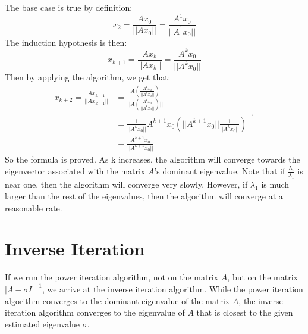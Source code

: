 \documentclass[11pt]{amsart}
\begin{document}
The base case is true by definition:
\[
	x_2 = \frac{Ax_0}{||Ax_0||} = \frac{A^1x_0}{||A^1x_0||}
\]
The induction hypothesis is then:
\[
	x_{k+1} = \frac{Ax_k}{||Ax_k||} = \frac{A^kx_0}{||A^kx_0||}
\]
Then by applying the algorithm, we get that:
\begin{align*}
	x_{k+2} = \frac{Ax_{k+1}}{||Ax_{k+1}||} &= \frac{A(\frac{A^kx_0}{||A^kx_0||})}{||A(\frac{A^kx_0}{||A^kx_0||})||}\\
	&= \frac{1}{||A^kx_0||}A^{k+1}x_0(||A^{k+1}x_0||\frac{1}{||A^kx_0||})^{-1} \\
	&=\frac{A^{k+1}x_0}{||A^{k+1}x_0||}
\end{align*}
So the formula is proved. As k increases, the algorithm will converge towards the eigenvector associated with the matrix $A$'s dominant eigenvalue. Note that if $\frac{\lambda_i}{\lambda_1}$ is near one, then the algorithm will converge very slowly. However, if $\lambda_1$ is much larger than the rest of the eigenvalues, then the algorithm will converge at a reasonable rate. 

\section*{Inverse Iteration}
If we run the power iteration algorithm, not on the matrix $A$, but on the matrix $|A-\sigma I|^{-1}$, we arrive at the inverse iteration algorithm. While the power iteration algorithm converges to the dominant eigenvalue of the matrix $A$, the inverse iteration algorithm converges to the eigenvalue of $A$ that is closest to the given estimated eigenvalue $\sigma$.
\end{document}
